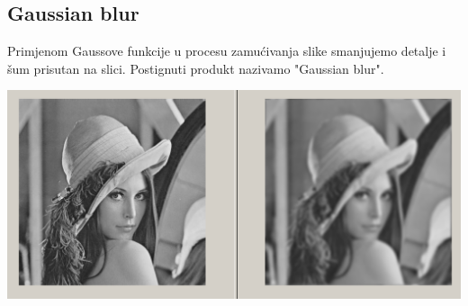\documentclass{article}
\begin{document}
\subsection{Gaussian blur}

Primjenom Gaussove funkcije u procesu zamućivanja slike smanjujemo detalje i šum prisutan na slici. Postignuti produkt nazivamo "Gaussian blur". %
\begin{center}
    \includegraphics[scale=0.25]{gauss.png}
\end{center}
\end{document}
